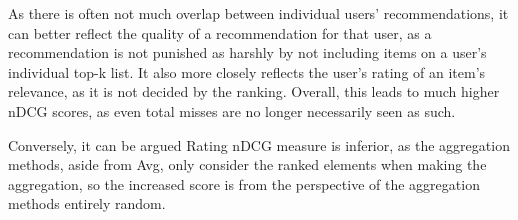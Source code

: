As there is often not much overlap between individual users' recommendations, it can better reflect the quality of a recommendation for that user, as a recommendation is not punished as harshly by not including items on a user's individual top-k list. It also more closely reflects the user's rating of an item's relevance, as it is not decided by the ranking. Overall, this leads to much higher nDCG scores, as even total misses are no longer necessarily seen as such.

Conversely, it can be argued Rating nDCG measure is inferior, as the aggregation methods, aside from Avg, only consider the ranked elements when making the aggregation, so the increased score is from the perspective of the aggregation methods entirely random.